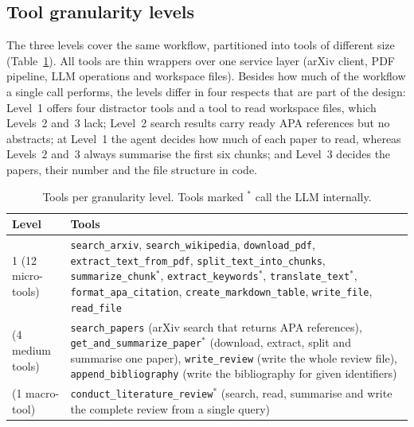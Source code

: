 \subsection{Tool granularity levels}
\label{sec:levels}

The three levels cover the same workflow, partitioned into tools of different size (Table~\ref{tab:tools}). All tools are thin wrappers over one service layer (arXiv client, PDF pipeline, LLM operations and workspace files). Besides how much of the workflow a single call performs, the levels differ in four respects that are part of the design: Level~1 offers four distractor tools and a tool to read workspace files, which Levels~2 and~3 lack; Level~2 search results carry ready APA references but no abstracts; at Level~1 the agent decides how much of each paper to read, whereas Levels~2 and~3 always summarise the first six chunks; and Level~3 decides the papers, their number and the file structure in code.

\begin{table}[t]
  \caption{Tools per granularity level. Tools marked $^\ast$ call the LLM internally.}
  \label{tab:tools}
  \centering
  \small
  \begin{tabularx}{\linewidth}{@{}l>{\raggedright\arraybackslash}X@{}}
    \toprule
    Level & Tools \\
    \midrule
    1 (12 micro-tools) & \texttt{search\_arxiv}, \texttt{search\_wikipedia}, \texttt{download\_pdf}, \texttt{extract\_text\_from\_pdf}, \texttt{split\_text\_into\_chunks}, \texttt{summarize\_chunk}$^\ast$, \texttt{extract\_keywords}$^\ast$, \texttt{translate\_text}$^\ast$, \texttt{format\_apa\_citation}, \texttt{create\_markdown\_table}, \texttt{write\_file}, \texttt{read\_file} \\
    \addlinespace
    2 (4 medium tools) & \texttt{search\_papers} (arXiv search that returns APA references), \texttt{get\_and\_summarize\_paper}$^\ast$ (download, extract, split and summarise one paper), \texttt{write\_review} (write the whole review file), \texttt{append\_bibliography} (write the bibliography for given identifiers) \\
    \addlinespace
    3 (1 macro-tool) & \texttt{conduct\_literature\_review}$^\ast$ (search, read, summarise and write the complete review from a single query) \\
    \bottomrule
  \end{tabularx}
\end{table}

